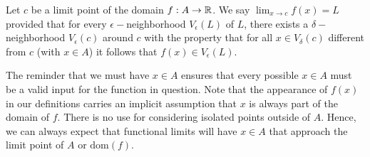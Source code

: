 \begin{definition}
    Let \( c  \) be a limit point of the domain \( f: A \to \mathbb{R}  \). We say \( \lim_{ x \to c } f(x) = L  \) provided that for every \( \epsilon - \)neighborhood \( V_{\epsilon }(L)  \) of \( L \), there exists a \( \delta- \)neighborhood \( V_{\epsilon }(c) \) around \( c \) with the property that for all \( x \in V_{\delta}(c) \) different from \( c  \) (with \( x \in A  \)) it follows that \( f(x) \in V_{\epsilon }(L) \).
\end{definition}

The reminder that we must have \( x \in A   \) ensures that every possible \( x \in A  \) must be a valid input for the function in question. Note that the appearance of \( f(x) \) in our definitions carries an implicit assumption that \( x  \) is always part of the domain of \( f \). There is no use for considering isolated points outside of \( A  \). Hence, we can always expect that functional limits will have \( x \in A  \) that approach the limit point of \( A  \) or \( \text{dom}(f) \).

